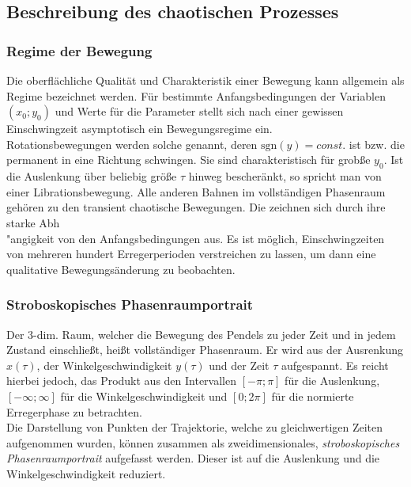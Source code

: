 \documentclass[numbers=noenddot,12pt,a4paper]{scrartcl}
\newcommand{\tilt}[1]{\textit{#1}}
\newcommand{\sgn}[1]{\text{sgn}\left(#1\right)}
\begin{document}
\subsection{Beschreibung des chaotischen Prozesses}
\subsubsection{Regime der Bewegung}
Die oberfl\"achliche Qualit\"at und Charakteristik einer Bewegung kann allgemein als Regime bezeichnet werden. F\"ur bestimmte Anfangsbedingungen der Variablen $\left(x_{0};y_0\right)$ und Werte f\"ur die Parameter stellt sich nach einer gewissen Einschwingzeit asymptotisch ein Bewegungsregime ein.\\
Rotationsbewegungen werden solche genannt, deren $\sgn{y}=const.$ ist bzw. die permanent in eine Richtung schwingen. Sie sind charakteristisch f\"ur grob{\ss}e $y_0$. Ist die Auslenkung \"uber beliebig gr\"o{\ss}e $\tau$ hinweg bescher\"ankt, so spricht man von einer Librationsbewegung. Alle anderen Bahnen im vollst\"andigen Phasenraum geh\"oren zu den transient chaotische Bewegungen. Die zeichnen sich durch ihre starke Abh\\"angigkeit von den Anfangsbedingungen aus. Es ist m\"oglich, Einschwingzeiten von mehreren hundert Erregerperioden verstreichen zu lassen, um dann eine qualitative Bewegungs\"anderung zu beobachten.
\subsubsection{Stroboskopisches Phasenraumportrait} \label{sec:strobo}
Der 3-dim. Raum, welcher die Bewegung des Pendels zu jeder Zeit und in jedem Zustand einschlie{\ss}t, hei{\ss}t vollst\"andiger Phasenraum. Er wird aus  der Ausrenkung $x(\tau)$, der Winkelgeschwindigkeit $y(\tau)$ und der Zeit $\tau$ aufgespannt.  Es reicht hierbei jedoch, das Produkt aus den Intervallen $\left[-\pi;\pi\right]$ f\"ur die Auslenkung, $\left[-\infty;\infty\right]$ f\"ur die Winkelgeschwindigkeit und $\left[0;2\pi\right]$ f\"ur die normierte Erregerphase zu betrachten. \\
Die Darstellung von Punkten der Trajektorie, welche zu gleichwertigen Zeiten aufgenommen wurden, k\"onnen zusammen als zweidimensionales, \tilt{stroboskopisches Phasenraumportrait} aufgefasst werden. Dieser ist auf die Auslenkung und die Winkelgeschwindigkeit reduziert.
\end{document}
